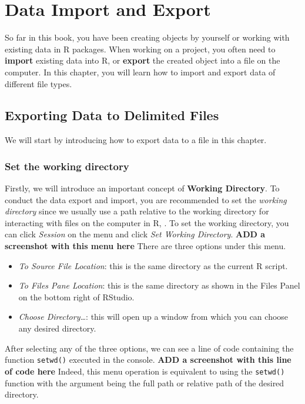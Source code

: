 \documentclass[
]{book}
\providecommand{\tightlist}{%
  \setlength{\itemsep}{0pt}\setlength{\parskip}{0pt}}
\begin{document}
\hypertarget{import-export}{%
\chapter{Data Import and Export}\label{import-export}}

So far in this book, you have been creating objects by yourself or working with existing data in R packages. When working on a project, you often need to \textbf{import} existing data into R, or \textbf{export} the created object into a file on the computer. In this chapter, you will learn how to import and export data of different file types.

\hypertarget{export-data}{%
\section{Exporting Data to Delimited Files}\label{export-data}}

We will start by introducing how to export data to a file in this chapter.

\hypertarget{set-the-working-directory}{%
\subsection{Set the working directory}\label{set-the-working-directory}}

Firstly, we will introduce an important concept of \textbf{Working Directory}. To conduct the data export and import, you are recommended to set the \emph{working directory} since we usually use a path relative to the working directory for interacting with files on the computer in R, . To set the working directory, you can click \emph{Session} on the menu and click \emph{Set Working Directory}. \textbf{ADD a screenshot with this menu here} There are three options under this menu.

\begin{itemize}
\tightlist
\item
  \emph{To Source File Location}: this is the same directory as the current R script.
\item
  \emph{To Files Pane Location}: this is the same directory as shown in the Files Panel on the bottom right of RStudio.
\item
  \emph{Choose Directory\ldots{}}: this will open up a window from which you can choose any desired directory.
\end{itemize}

After selecting any of the three options, we can see a line of code containing the function \texttt{setwd()} executed in the console. \textbf{ADD a screenshot with this line of code here} Indeed, this menu operation is equivalent to using the \texttt{setwd()} function with the argument being the full path or relative path of the desired directory.
\end{document}
